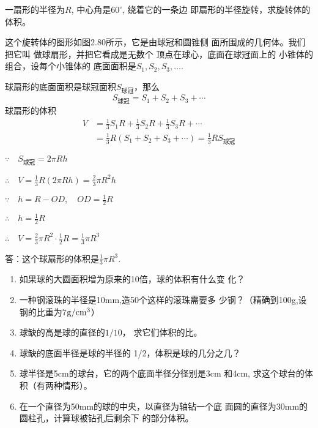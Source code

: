\begin{example}
    一扇形的半径为$R$, 中心角是$60^{\circ}$, 绕着它的一条边
    即扇形的半径旋转，求旋转体的体积。
\end{example}

\begin{solution}
    这个旋转体的图形如图2.80所示，它是由球冠和圆锥侧
面所围成的几何体。我们把它叫
做球扇形，并把它看成是无数个
顶点在球心，底面在球冠面上的
小锥体的组合，设每个小锥体的
底面面积是$S_1,S_2,S_3,\ldots$. 

球扇形的底面面积是球冠面积$S_{\text{球冠}}$，那么
\[S_{\text{球冠}}=S_1+S_2+S_3+\cdots\]
球扇形的体积
\[\begin{split}
    V&=\frac{1}{3}S_1R+\frac{1}{3}S_2R+\frac{1}{3}S_3R+\cdots\\
&=\frac{1}{3}R(S_1+S_2+S_3+\cdots)=\frac{1}{3}RS_{\text{球冠}}
\end{split}    
\]

$\because\quad S_{\text{球冠}}=2\pi Rh$

$\therefore\quad V=\frac{1}{3}R(2\pi Rh)=\frac{2}{3}\pi R^2h$

$\because\quad h=R-OD,\quad OD=\frac{1}{2}R$

$\therefore\quad h=\frac{1}{2}R$

$\therefore\quad V=\frac{2}{3}\pi R^2\cdot \frac{1}{2}R=\frac{1}{3}\pi R^3$

答：这个球扇形的体积是$\frac{1}{3}\pi R^3$.
\end{solution}



\begin{ex}
\begin{enumerate}
    \item 如果球的大圆面积增为原来的10倍，球的体积有什么变
    化？
    \item 一种钢滚珠的半径是10mm,造50个这样的滚珠需要多
    少钢？（精确到100g,设钢的比重为7${\rm g/cm^3}$）
    \item 球缺的高是球的直径的$1/10$，
    求它们体积的比。
    \item 球缺的底面半径是球的半径的
    1/2，体积是球的几分之几？
    \item 球半径是5cm的球台，它的两个底面半径分径别是3cm
    和4cm, 求这个球台的体积（有两种情形）。
    \item 在一个直径为50mm的球的中央，以直径为轴钻一个底
    面圆的直径为30mm的圆柱孔，计算球被钻孔后剩余下
    的部分体积。
\end{enumerate}
\end{ex}

